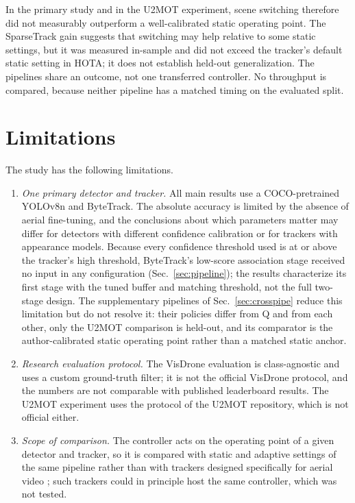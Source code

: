\documentclass[journal]{new-aiaa}
\begin{document}
In the primary study and in the U2MOT experiment, scene switching therefore did not measurably outperform a well-calibrated static operating point. The SparseTrack gain suggests that switching may help relative to some static settings, but it was measured in-sample and did not exceed the tracker's default static setting in HOTA; it does not establish held-out generalization. The pipelines share an outcome, not one transferred controller. No throughput is compared, because neither pipeline has a matched timing on the evaluated split.

\section{Limitations}\label{sec:limits}
The study has the following limitations.
\begin{enumerate}
\item \emph{One primary detector and tracker.} All main results use a COCO-pretrained YOLOv8n and ByteTrack. The absolute accuracy is limited by the absence of aerial fine-tuning, and the conclusions about which parameters matter may differ for detectors with different confidence calibration or for trackers with appearance models. Because every confidence threshold used is at or above the tracker's high threshold, ByteTrack's low-score association stage received no input in any configuration (Sec.~\ref{sec:pipeline}); the results characterize its first stage with the tuned buffer and matching threshold, not the full two-stage design. The supplementary pipelines of Sec.~\ref{sec:crosspipe} reduce this limitation but do not resolve it: their policies differ from Q and from each other, only the U2MOT comparison is held-out, and its comparator is the author-calibrated static operating point rather than a matched static anchor.
\item \emph{Research evaluation protocol.} The VisDrone evaluation is class-agnostic and uses a custom ground-truth filter; it is not the official VisDrone protocol, and the numbers are not comparable with published leaderboard results. The U2MOT experiment uses the protocol of the U2MOT repository, which is not official either.
\item \emph{Scope of comparison.} The controller acts on the operating point of a given detector and tracker, so it is compared with static and adaptive settings of the same pipeline rather than with trackers designed specifically for aerial video \cite{liu2022uavmot}; such trackers could in principle host the same controller, which was not tested.

\end{enumerate}
\end{document}
